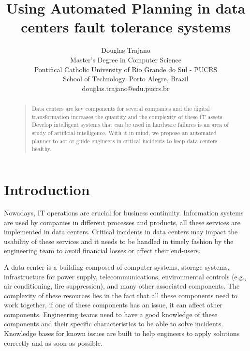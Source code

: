 \documentclass[letterpaper]{article}
\begin{document}
%
\title{Using Automated Planning in data centers fault tolerance systems}
\author{Douglas Trajano\\
Master's Degree in Computer Science\\
Pontifical Catholic University of Rio Grande do Sul - PUCRS\\
School of Technology. Porto Alegre, Brazil\\
douglas.trajano@edu.pucrs.br
}
\maketitle
\begin{abstract}
\begin{quote}
Data centers are key components for several companies and the digital transformation increases the quantity and the complexity of these IT assets. Develop intelligent systems that can be used in hardware failures is an area of study of artificial intelligence. With it in mind, we propose an automated planner to act or guide engineers in critical incidents to keep data centers healthy.
\end{quote}
\end{abstract}

\section{Introduction}

Nowadays, IT operations are crucial for business continuity. Information systems are used by companies in different processes and products, all these services are implemented in data centers. Critical incidents in data centers may impact the usability of these services and it needs to be handled in timely fashion by the engineering team to avoid financial losses or affect their end-users.

A data center is a building composed of computer systems, storage systems, infrastructure for power supply, telecommunications, environmental controls (e.g., air conditioning, fire suppression), and many other associated components. The complexity of these resources lies in the fact that all these components need to work together, if one of these components has an issue, it can affect other components. Engineering teams need to have a good knowledge of these components and their specific characteristics to be able to solve incidents. Knowledge bases for known issues are built to help engineers to apply solutions correctly and as soon as possible.
\end{document}
